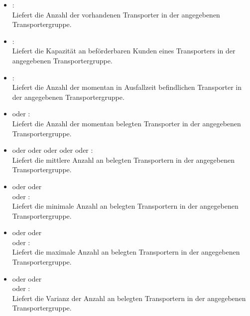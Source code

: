 \begin{itemize}
  
\item
{}:\\
Liefert die Anzahl der vorhandenen Transporter in der angegebenen Transportergruppe.
  
\item
{}:\\
Liefert die Kapazität an beförderbaren Kunden eines Transporters in der angegebenen Transportergruppe.
  
\item
{}:\\
Liefert die Anzahl der momentan in Ausfallzeit befindlichen Transporter in der angegebenen Transportergruppe.

\item
{} oder :\\
Liefert die Anzahl der momentan belegten Transporter in der angegebenen Transportergruppe.
  
\item
{} oder  oder  oder  oder  oder :\\
Liefert die mittlere Anzahl an belegten Transportern in der angegebenen Transportergruppe.
  
\item
{} oder  oder\\
 oder :\\
Liefert die minimale Anzahl an belegten Transportern in der angegebenen Transportergruppe.
  
\item
{} oder  oder\\
 oder :\\
Liefert die maximale Anzahl an belegten Transportern in der angegebenen Transportergruppe.
  
\item
{} oder  oder\\
 oder :\\
Liefert die Varianz der Anzahl an belegten Transportern in der angegebenen Transportergruppe.
  

\end{itemize}
